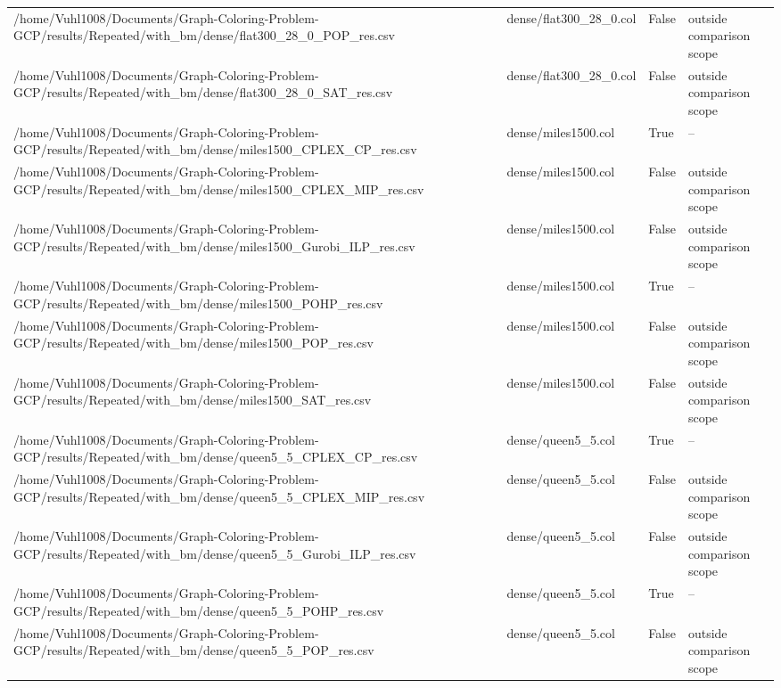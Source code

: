 \begin{table}[htbp]
\begin{tabular}{llll}
/home/Vuhl1008/Documents/Graph-Coloring-Problem-GCP/results/Repeated/with\_bm/dense/flat300\_28\_0\_POP\_res.csv & dense/flat300\_28\_0.col & False & outside comparison scope \\
/home/Vuhl1008/Documents/Graph-Coloring-Problem-GCP/results/Repeated/with\_bm/dense/flat300\_28\_0\_SAT\_res.csv & dense/flat300\_28\_0.col & False & outside comparison scope \\
/home/Vuhl1008/Documents/Graph-Coloring-Problem-GCP/results/Repeated/with\_bm/dense/miles1500\_CPLEX\_CP\_res.csv & dense/miles1500.col & True & -- \\
/home/Vuhl1008/Documents/Graph-Coloring-Problem-GCP/results/Repeated/with\_bm/dense/miles1500\_CPLEX\_MIP\_res.csv & dense/miles1500.col & False & outside comparison scope \\
/home/Vuhl1008/Documents/Graph-Coloring-Problem-GCP/results/Repeated/with\_bm/dense/miles1500\_Gurobi\_ILP\_res.csv & dense/miles1500.col & False & outside comparison scope \\
/home/Vuhl1008/Documents/Graph-Coloring-Problem-GCP/results/Repeated/with\_bm/dense/miles1500\_POHP\_res.csv & dense/miles1500.col & True & -- \\
/home/Vuhl1008/Documents/Graph-Coloring-Problem-GCP/results/Repeated/with\_bm/dense/miles1500\_POP\_res.csv & dense/miles1500.col & False & outside comparison scope \\
/home/Vuhl1008/Documents/Graph-Coloring-Problem-GCP/results/Repeated/with\_bm/dense/miles1500\_SAT\_res.csv & dense/miles1500.col & False & outside comparison scope \\
/home/Vuhl1008/Documents/Graph-Coloring-Problem-GCP/results/Repeated/with\_bm/dense/queen5\_5\_CPLEX\_CP\_res.csv & dense/queen5\_5.col & True & -- \\
/home/Vuhl1008/Documents/Graph-Coloring-Problem-GCP/results/Repeated/with\_bm/dense/queen5\_5\_CPLEX\_MIP\_res.csv & dense/queen5\_5.col & False & outside comparison scope \\
/home/Vuhl1008/Documents/Graph-Coloring-Problem-GCP/results/Repeated/with\_bm/dense/queen5\_5\_Gurobi\_ILP\_res.csv & dense/queen5\_5.col & False & outside comparison scope \\
/home/Vuhl1008/Documents/Graph-Coloring-Problem-GCP/results/Repeated/with\_bm/dense/queen5\_5\_POHP\_res.csv & dense/queen5\_5.col & True & -- \\
/home/Vuhl1008/Documents/Graph-Coloring-Problem-GCP/results/Repeated/with\_bm/dense/queen5\_5\_POP\_res.csv & dense/queen5\_5.col & False & outside comparison scope \\

\end{tabular}
\end{table}
